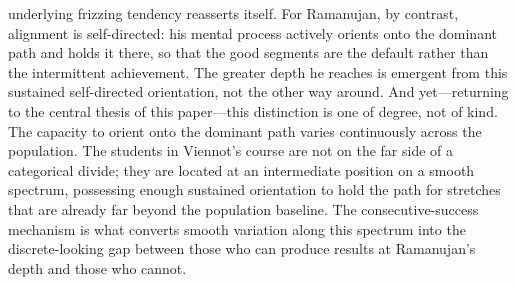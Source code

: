 \documentclass{article}
\begin{document}
underlying frizzing tendency reasserts itself. For Ramanujan, by contrast, alignment is self-directed: his mental process actively orients onto the dominant path and holds it there, so that the good segments are the default rather than the intermittent achievement. The greater depth he reaches is emergent from this sustained self-directed orientation, not the other way around. And yet---returning to the central thesis of this paper---this distinction is one of degree, not of kind. The capacity to orient onto the dominant path varies continuously across the population. The students in Viennot's course are not on the far side of a categorical divide; they are located at an intermediate position on a smooth spectrum, possessing enough sustained orientation to hold the path for stretches that are already far beyond the population baseline. The consecutive-success mechanism is what converts smooth variation along this spectrum into the discrete-looking gap between those who can produce results at Ramanujan's depth and those who cannot.
\end{document}
